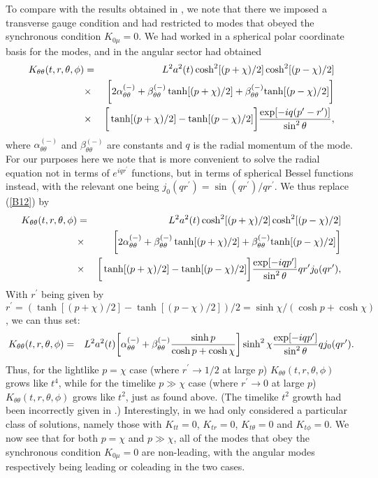 To compare with the results obtained in \cite{mannheim_2012}, we note that there we imposed a  transverse gauge condition and had restricted to modes that obeyed the synchronous condition $K_{0\mu}=0$. We had worked in a spherical polar coordinate basis for the modes, and in the angular sector had obtained 
%
\begin{eqnarray}
K_{\theta\theta}(t,r,\theta,\phi)&=&L^2a^2(t)\cosh^2[(p+\chi)/2]\cosh^2[(p-\chi)/2]
\\
&\times&\bigg{[}2\alpha^{(-)}_{\theta\theta}+\beta^{(-)}_{\theta\theta}\tanh[(p+\chi)/2]+\beta^{(-)}_{\theta\theta}{\rm tanh}[(p-\chi)/2]\bigg{]}
\nonumber\\
&\times&\bigg{[}\tanh[(p+\chi)/2]-\tanh[(p-\chi)/2]\bigg{]}\frac{\exp[-iq(p^{\prime}-r^{\prime})]}{\sin^2\theta},
\nonumber
\label{B12}
\end{eqnarray}
%
where $\alpha^{(-)}_{\theta\theta}$ and $\beta^{(-)}_{\theta\theta}$ are constants and $q$ is the radial momentum of the mode. For our purposes here we note that is more convenient to solve the radial equation not in terms of $e^{iqr^{\prime}}$ functions, but in terms of spherical Bessel functions instead, with the relevant one being $j_0(qr^{\prime})=\sin(qr^{\prime})/qr^{\prime}$. We thus replace (\ref{B12}) by
%
\begin{eqnarray}
K_{\theta\theta}(t,r,\theta,\phi)&=&L^2a^2(t)\cosh^2[(p+\chi)/2]\cosh^2[(p-\chi)/2]
\\
&\times&\bigg{[}2\alpha^{(-)}_{\theta\theta}+\beta^{(-)}_{\theta\theta}\tanh[(p+\chi)/2]+\beta^{(-)}_{\theta\theta}{\rm tanh}[(p-\chi)/2]\bigg{]}
\nonumber\\
&\times&\bigg{[}\tanh[(p+\chi)/2]-\tanh[(p-\chi)/2]\bigg{]}\frac{\exp[-iqp^{\prime}]}{\sin^2\theta}qr^{\prime}j_0(qr^{\prime}),
\nonumber
\label{B13}
\end{eqnarray}
%
With $r^{\prime}$ being given by $r^{\prime}=(\tanh[(p+\chi)/2]-\tanh[(p-\chi)/2])/2=\sinh\chi/(\cosh p+\cosh \chi)$,  we can thus set: 
%
\begin{eqnarray}
K_{\theta\theta}(t,r,\theta,\phi)&=&L^2a^2(t)\bigg{[}\alpha^{(-)}_{\theta\theta}
+\beta^{(-)}_{\theta\theta}\frac{\sinh p}{\cosh p +\cosh \chi}\bigg{]}\sinh^2\chi\frac{\exp[-iqp^{\prime}]}{\sin^2\theta}qj_0(qr^{\prime}).
\nonumber\\
\label{B14}
\end{eqnarray}
%
Thus, for the lightlike $p=\chi$ case (where $r^{\prime}\rightarrow 1/2$ at large $p$) $K_{\theta\theta}(t,r,\theta,\phi)$ grows like $t^4$, while for the timelike $p\gg \chi$ case (where $r^{\prime}\rightarrow 0$ at large $p$) $K_{\theta\theta}(t,r,\theta,\phi)$ grows like $t^2$, just as found above. (The timelike $t^2$ growth had been incorrectly given in \cite{mannheim_2012}.) Interestingly, in \cite{mannheim_2012}  we had only considered a particular class of solutions, namely those with $K_{tt}=0$, $K_{tr}=0$, $K_{t\theta}=0$ and $K_{t\phi}=0$. We now see that for both $p=\chi$ and $p \gg \chi$, all of the modes that obey the synchronous condition $K_{0\mu}=0$  are non-leading, with the angular modes respectively being leading or coleading in the two cases.

